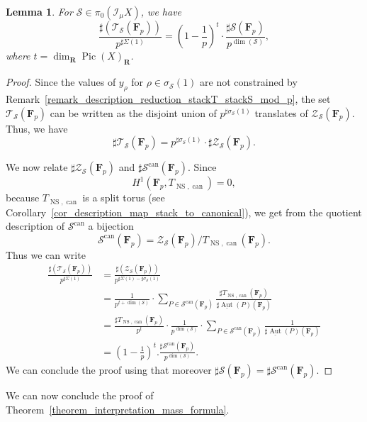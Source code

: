 \documentclass{proc-l}
\newcommand{\R}{\mathbf{R}}
\newcommand{\F}{\mathbf{F}}
\DeclareMathOperator{\Pic}{Pic}
\DeclareMathOperator{\Aut}{Aut}
\DeclareMathOperator{\can}{can}
\DeclareMathOperator{\NS}{NS}
\newcommand{\stackZ}{\mathcal{Z}}
\newcommand{\stackS}{\mathcal{S}}
\newcommand{\stackT}{\mathcal{T}}
\newcommand{\sheafI}{\mathcal{I}}
\newcommand{\sector}{\pi_0(\sheafI_{\mu} X)}
\newtheorem{lemma}[theorem]{Lemma}
\theoremstyle{definition}
\theoremstyle{remark}
\numberwithin{equation}{section}
\begin{document}
\begin{lemma}\label{lemma_computation_cardinal_torsor_sector}
For $\stackS \in \sector$, we have
\[
\frac{\sharp(\stackT_{\stackS}(\F_p))}{p^{\sharp \Sigma(1)}}
=
\left(1-\frac{1}{p}\right)^t
\cdot
\frac{\sharp \stackS(\F_p)}{p^{\dim(\stackS)}},
\]
where $t = \dim_{\R} \Pic(X)_{\R}$.
\end{lemma}

\begin{proof}
Since the values of $y_{\rho}$ for $\rho \in \sigma_\stackS(1)$ are not constrained by Remark~\ref{remark_description_reduction_stackT_stackS_mod_p}, the set $\stackT_{\stackS}(\F_p)$ can be written as the disjoint union of $p^{\sharp \sigma_\stackS(1)}$ translates of $\stackZ_{\stackS}(\F_p)$. Thus, we have
\[
\sharp \stackT_{\stackS}(\F_p)
=
p^{\sharp \sigma_\stackS(1)} \cdot \sharp \stackZ_{\stackS}(\F_p).
\]

We now relate $\sharp \stackZ_{\stackS}(\F_p)$ and $\sharp \stackS^{\can}(\F_p)$.
Since
\[
H^1(\F_p,T_{\NS,\can}) = 0,
\]
because $T_{\NS,\can}$ is a split torus (see Corollary~\ref{cor_description_map_stack_to_canonical}),
we get from the quotient description of $\stackS^{\can}$ a bijection
\[
\stackS^{\can}(\F_p)
=
\stackZ_{\stackS}(\F_p) / T_{\NS,\can}(\F_p).
\]Thus we can write
\begin{align*}
    \frac{\sharp(\stackT_{\stackS}(\F_p))}{p^{\sharp \Sigma(1)}} &=\frac{\sharp(\stackZ_{\stackS}(\F_p))}{p^{\sharp \Sigma(1) - \sharp \sigma_\stackS(1)}}  \\
    &= \frac{1}{p^{t + \dim(\stackS)}} \cdot \sum\limits_{P \in \stackS^{\can}(\F_p)} \frac{\sharp T_{\NS,\can}(\F_p)}{\sharp \underline{\Aut}(P)(\F_p) } \\
    &=  \frac{\sharp T_{\NS,\can}(\F_p)}{p^t} \cdot \frac{1}{p^{\dim(\stackS)}} \cdot \sum\limits_{P \in \stackS^{\can}(\F_p)} \frac{1}{\sharp \underline{\Aut}(P)(\F_p) } \\
    &= \left( 1 - \frac{1}{p} \right)^{t} . \frac{\sharp \stackS^{\can} \left(\F_p \right) }{p^{\dim(\stackS)}} .
\end{align*}We can conclude the proof using that moreover $\sharp \stackS(\F_p) = \sharp \stackS^{\can}(\F_p)$.
\end{proof}

We can now conclude the proof of Theorem~\ref{theorem_interpretation_mass_formula}.
\end{document}
